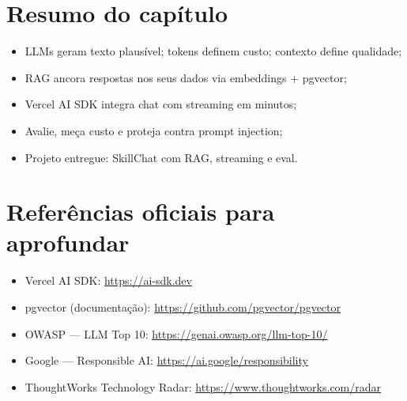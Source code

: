 \section{Resumo do capítulo}

\begin{itemize}[leftmargin=*, itemsep=0.3em]
  \item LLMs geram texto plausível; tokens definem custo; contexto define qualidade;
  \item RAG ancora respostas nos seus dados via embeddings + pgvector;
  \item Vercel AI SDK integra chat com streaming em minutos;
  \item Avalie, meça custo e proteja contra prompt injection;
  \item Projeto entregue: SkillChat com RAG, streaming e eval.
\end{itemize}

\section{Referências oficiais para aprofundar}

\begin{itemize}[leftmargin=*, itemsep=0.3em]
  \item Vercel AI SDK: \url{https://ai-sdk.dev}
  \item pgvector (documentação): \url{https://github.com/pgvector/pgvector}
  \item OWASP — LLM Top 10: \url{https://genai.owasp.org/llm-top-10/}
  \item Google — Responsible AI: \url{https://ai.google/responsibility}
  \item ThoughtWorks Technology Radar: \url{https://www.thoughtworks.com/radar}
\end{itemize}
